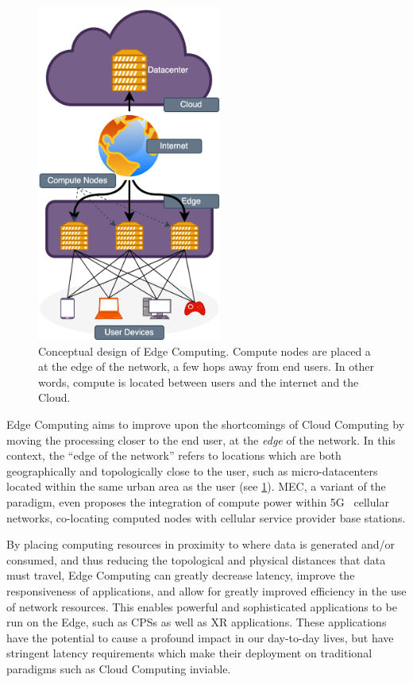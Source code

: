 \begin{figure}
    \centering
    \includegraphics[height=30em]{figures/edgecomputing}
    \caption{%
        Conceptual design of Edge Computing.
        Compute nodes are placed a at the edge of the network, a few hops away from end users.
        In other words, compute is located between users and the internet and the Cloud.
    }\label{fig:edgecomputing}
\end{figure}

Edge Computing aims to improve upon the shortcomings of Cloud Computing by moving the processing closer to the end user, at the \emph{edge} of the network.
In this context, the ``edge of the network'' refers to locations which are both geographically and topologically close to the user, such as micro-datacenters located within the same urban area as the user (see \cref{fig:edgecomputing}).
\gls{MEC}, a variant of the paradigm, even proposes the integration of compute power within 5G~\cite{5Gstandard} cellular networks, co-locating computed nodes with cellular service provider base stations.

By placing computing resources in proximity to where data is generated and/or consumed, and thus reducing the topological and physical distances that data must travel, Edge Computing can greatly decrease latency, improve the responsiveness of applications, and allow for greatly improved efficiency in the use of network resources.
This enables powerful and sophisticated applications to be run on the Edge, such as \glspl{CPS} as well as \gls{XR} applications.
These applications have the potential to cause a profound impact in our day-to-day lives, but have stringent latency requirements which make their deployment on traditional paradigms such as Cloud Computing inviable.

